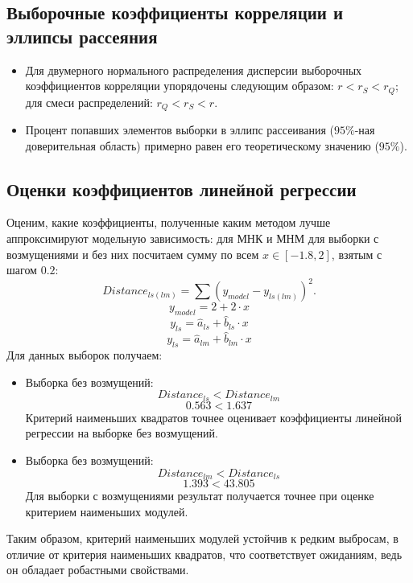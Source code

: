 \documentclass[../body.tex]{subfiles}
\begin{document}
	\subsection{Выборочные коэффициенты корреляции и эллипсы рассеяния}
	\begin{itemize}
		\item Для двумерного нормального распределения дисперсии выборочных коэффициентов корреляции упорядочены следующим образом: $r < r_{S} < r_{Q}$; для смеси распределений: $r_{Q} < r_{S} < r$.
		\item Процент попавших элементов выборки в эллипс рассеивания ($95\%$-ная доверительная область) примерно равен его теоретическому значению ($95\%$).
	\end{itemize}
	
	\subsection{Оценки коэффициентов линейной регрессии} Оценим, какие коэффициенты, полученные каким методом лучше аппроксимируют модельную зависимость: для МНК и МНМ для выборки с возмущениями и без них посчитаем сумму по всем $x \in [-1.8, 2]$, взятым с шагом $0.2$: $$Distance_{ls(lm)} = \sum{(y_{model} - y_{ls(lm)})^2}.$$
	$$y_{model} = 2 + 2 \cdot x$$
	$$y_{ls} = \hat{a}_{ls} + \hat{b}_{ls} \cdot x$$
	$$y_{ls} = \hat{a}_{lm} + \hat{b}_{lm} \cdot x$$
	Для данных выборок получаем:
	\begin{itemize}
		\item Выборка без возмущений: $$Distance_{ls} < Distance_{lm}$$ $$0.563  <  1.637$$
		Критерий наименьших квадратов точнее оценивает коэффициенты линейной регрессии на выборке без возмущений. 
		\item Выборка без возмущений: $$Distance_{lm} < Distance_{ls}$$ $$1.393  <  43.805$$
		Для выборки с возмущениями результат получается точнее при оценке критерием наименьших модулей.
	\end{itemize}
	Таким образом, критерий наименьших модулей устойчив к редким выбросам, в отличие от критерия наименьших квадратов, что соответствует ожиданиям, ведь он обладает робастными свойствами.
	
\end{document}

